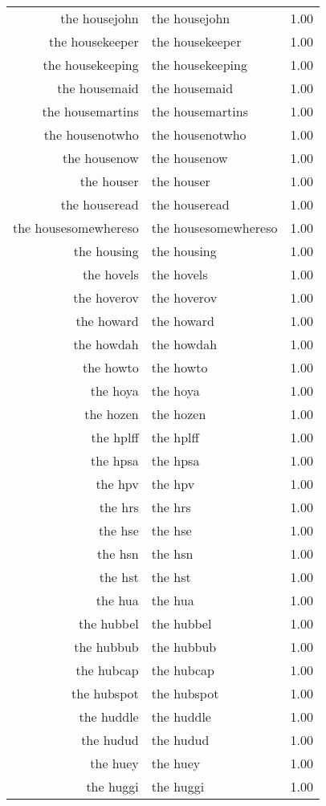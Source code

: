 \begin{table}[ht]
\begin{tabular}{rlr}
  the housejohn & the housejohn & 1.00 \\ 
  the housekeeper & the housekeeper & 1.00 \\ 
  the housekeeping & the housekeeping & 1.00 \\ 
  the housemaid & the housemaid & 1.00 \\ 
  the housemartins & the housemartins & 1.00 \\ 
  the housenotwho & the housenotwho & 1.00 \\ 
  the housenow & the housenow & 1.00 \\ 
  the houser & the houser & 1.00 \\ 
  the houseread & the houseread & 1.00 \\ 
  the housesomewhereso & the housesomewhereso & 1.00 \\ 
  the housing & the housing & 1.00 \\ 
  the hovels & the hovels & 1.00 \\ 
  the hoverov & the hoverov & 1.00 \\ 
  the howard & the howard & 1.00 \\ 
  the howdah & the howdah & 1.00 \\ 
  the howto & the howto & 1.00 \\ 
  the hoya & the hoya & 1.00 \\ 
  the hozen & the hozen & 1.00 \\ 
  the hplff & the hplff & 1.00 \\ 
  the hpsa & the hpsa & 1.00 \\ 
  the hpv & the hpv & 1.00 \\ 
  the hrs & the hrs & 1.00 \\ 
  the hse & the hse & 1.00 \\ 
  the hsn & the hsn & 1.00 \\ 
  the hst & the hst & 1.00 \\ 
  the hua & the hua & 1.00 \\ 
  the hubbel & the hubbel & 1.00 \\ 
  the hubbub & the hubbub & 1.00 \\ 
  the hubcap & the hubcap & 1.00 \\ 
  the hubspot & the hubspot & 1.00 \\ 
  the huddle & the huddle & 1.00 \\ 
  the hudud & the hudud & 1.00 \\ 
  the huey & the huey & 1.00 \\ 
  the huggi & the huggi & 1.00 \\ 

\end{tabular}
\end{table}

